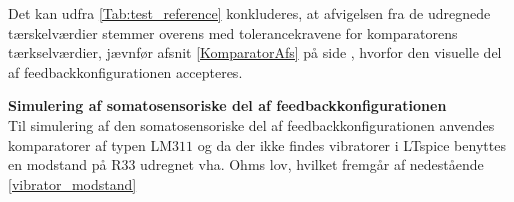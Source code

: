 
\noindent Det kan udfra \ref{Tab:test_reference} konkluderes, at afvigelsen fra de udregnede tærskelværdier stemmer overens med tolerancekravene for komparatorens tærkselværdier, jævnfør afsnit \ref{KomparatorAfs} på side \pageref{KomparatorAfs}, hvorfor den visuelle del af feedbackkonfigurationen accepteres. 

\noindent\textbf{Simulering af somatosensoriske del af feedbackkonfigurationen} \\
Til simulering af den somatosensoriske del af feedbackkonfigurationen anvendes komparatorer af typen LM$311$ og da der ikke findes vibratorer i LTspice benyttes en modstand på R$33$ udregnet vha. Ohms lov, hvilket fremgår af nedestående \eqref{vibrator_modstand} 

